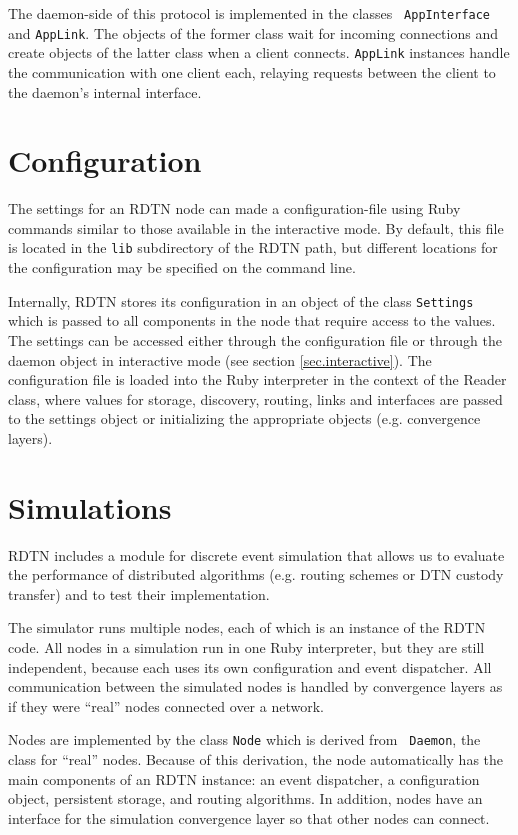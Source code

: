 \documentclass[a4paper]{article}
\begin{document}
The daemon-side of this protocol is implemented in the classes {\tt
AppInterface} and {\tt AppLink}. The objects of the former class
wait for incoming connections and create objects of the latter class when a
client connects. {\tt AppLink} instances handle the communication with
one client each, relaying requests between the client to the daemon's internal
interface.

\section{Configuration}\label{sec.config}

The settings for an RDTN node can made a configuration-file using Ruby commands
similar to those available in the interactive mode. By default, this file is
located in the {\tt lib} subdirectory of the RDTN path, but different locations
for the configuration may be specified on the command line.

Internally, RDTN stores its configuration in an object of the class
{\tt Settings} which is passed to all components in the node that require
access to the values. The settings can be accessed either through the
configuration file or through the daemon object in interactive mode (see section
\ref{sec.interactive}). The configuration file is loaded into the Ruby
interpreter in the context of the Reader class, where values for
storage, discovery, routing, links and interfaces are passed to the settings
object or initializing the appropriate objects (e.g. convergence layers).

\section{Simulations}\label{sec.sim}

RDTN includes a module for discrete event simulation that allows us to evaluate
the performance of distributed algorithms (e.g.  routing schemes or DTN custody
transfer) and to test their implementation.

The simulator runs multiple nodes, each of which is an instance of the RDTN
code. All nodes in a simulation run in one Ruby interpreter, but they are still
independent, because each uses its own configuration and event dispatcher. All
communication between the simulated nodes is handled by convergence layers
as if they were ``real'' nodes connected over a network.

Nodes are implemented by the class {\tt Node} which is derived from {\tt
Daemon}, the class for ``real'' nodes. Because of this derivation, the node
automatically has the main components of an RDTN instance: an event dispatcher,
a configuration object, persistent storage, and routing algorithms. In addition,
nodes have an interface for the simulation convergence layer so that other nodes
can connect.
\end{document}
